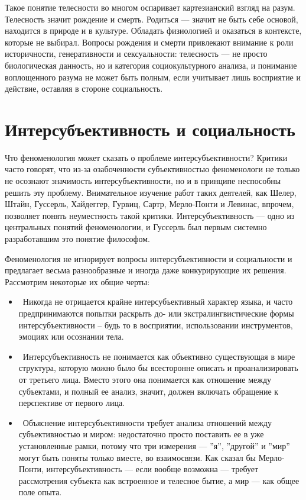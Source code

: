\documentclass[11pt]{book}
\begin{document}
Такое понятие телесности во многом оспаривает картезианский взгляд на разум. Телесность значит рождение и смерть. Родиться --- значит не быть себе основой, находится в природе и в культуре. Обладать физиологией и оказаться в контексте, которые не выбирал. Вопросы рождения и смерти привлекают внимание к роли историчности, генеративности и сексуальности: телесность --- не просто биологическая данность, но и категория социокультурного анализа, и понимание воплощенного разума не может быть полным, если учитывает лишь восприятие и действие, оставляя в стороне социальность.

\chapter{Интерсубъективность и социальность}

Что феноменология может сказать о проблеме интерсубъективности? Критики часто говорят, что из-за озабоченности субъективностью феноменологи не только не осознают значимость интерсубъективности, но и в принципе неспособны решить эту проблему. Внимательное изучение работ таких деятелей, как Шелер, Штайн, Гуссерль, Хайдеггер, Гурвиц, Сартр, Мерло-Понти и Левинас, впрочем, позволяет понять неуместность такой критики. Интерсубъективность --- одно из центральных понятий феноменологии, и Гуссерль был первым системно разработавшим это понятие философом.

Феноменология не игнорирует вопросы интерсубъективности и социальности и предлагает весьма разнообразные и иногда даже конкурирующие их решения. Рассмотрим некоторые их общие черты:

\begin{itemize}
  \item\ Никогда не отрицается крайне интерсубъективный характер языка, и часто предпринимаются попытки раскрыть до- или экстралингвистические формы интерсубъективности -- будь то в восприятии, использовании инструментов, эмоциях или осознании тела.
  \item\ Интерсубъективность не понимается как объективно существующая в мире структура, которую можно было бы всесторонне описать и проанализировать от третьего лица. Вместо этого она понимается как отношение между субъектами, и полный ее анализ, значит, должен включать обращение к перспективе от первого лица.
  \item\ Объяснение интерсубъективности требует анализа отношений между субъективностью и миром: недостаточно просто поставить ее в уже установленные рамки, потому что три измерения --- ''я'', ''другой'' и ''мир'' могут быть поняты только вместе, во взаимосвязи. Как сказал бы Мерло-Понти, интерсубъективность --- если вообще возможна --- требует рассмотрения субъекта как встроенное и телесное бытие, а мир --- как общее поле опыта.
\end{itemize}
\end{document}
